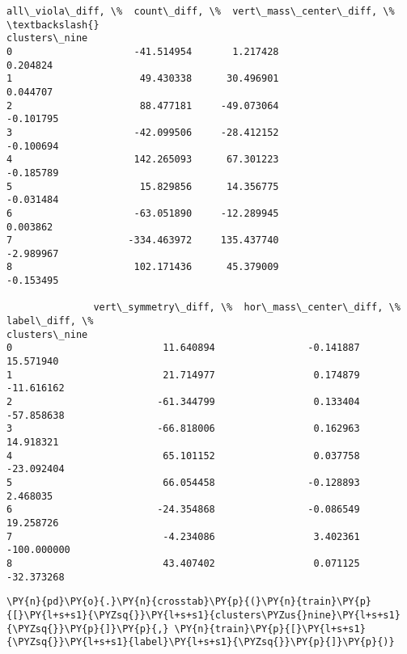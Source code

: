             \begin{tcolorbox}[breakable, size=fbox, boxrule=.5pt, pad at break*=1mm, opacityfill=0]
\begin{Verbatim}[commandchars=\\\{\}]
               all\_viola\_diff, \%  count\_diff, \%  vert\_mass\_center\_diff, \%  \textbackslash{}
clusters\_nine
0                     -41.514954       1.217428                  0.204824
1                      49.430338      30.496901                  0.044707
2                      88.477181     -49.073064                 -0.101795
3                     -42.099506     -28.412152                 -0.100694
4                     142.265093      67.301223                 -0.185789
5                      15.829856      14.356775                 -0.031484
6                     -63.051890     -12.289945                  0.003862
7                    -334.463972     135.437740                 -2.989967
8                     102.171436      45.379009                 -0.153495

               vert\_symmetry\_diff, \%  hor\_mass\_center\_diff, \%  label\_diff, \%
clusters\_nine
0                          11.640894                -0.141887      15.571940
1                          21.714977                 0.174879     -11.616162
2                         -61.344799                 0.133404     -57.858638
3                         -66.818006                 0.162963      14.918321
4                          65.101152                 0.037758     -23.092404
5                          66.054458                -0.128893       2.468035
6                         -24.354868                -0.086549      19.258726
7                          -4.234086                 3.402361    -100.000000
8                          43.407402                 0.071125     -32.373268
\end{Verbatim}
\end{tcolorbox}
        
    \begin{tcolorbox}[breakable, size=fbox, boxrule=1pt, pad at break*=1mm,colback=cellbackground, colframe=cellborder]
\begin{Verbatim}[commandchars=\\\{\}]
\PY{n}{pd}\PY{o}{.}\PY{n}{crosstab}\PY{p}{(}\PY{n}{train}\PY{p}{[}\PY{l+s+s1}{\PYZsq{}}\PY{l+s+s1}{clusters\PYZus{}nine}\PY{l+s+s1}{\PYZsq{}}\PY{p}{]}\PY{p}{,} \PY{n}{train}\PY{p}{[}\PY{l+s+s1}{\PYZsq{}}\PY{l+s+s1}{label}\PY{l+s+s1}{\PYZsq{}}\PY{p}{]}\PY{p}{)}
\end{Verbatim}
\end{tcolorbox}

